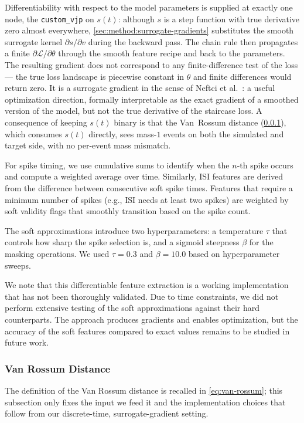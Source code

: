 Differentiability with respect to the model parameters is supplied at exactly one node, the \texttt{custom\_vjp} on $s(t)$:
although $s$ is a step function with true derivative zero almost everywhere,
\cref{sec:method:surrogate-gradients} substitutes the smooth surrogate kernel $\partial s/\partial v$ during the backward pass.
The chain rule then propagates a finite $\partial\mathcal{L}/\partial\theta$ through the smooth feature recipe and back to the parameters.
The resulting gradient does not correspond to any finite-difference test of the loss ---
the true loss landscape is piecewise constant in $\theta$ and finite differences would return zero.
It is a surrogate gradient in the sense of Neftci et al.~\cite{Neftci2019}: a useful optimization direction,
formally interpretable as the exact gradient of a smoothed version of the model, but not the true derivative of the staircase loss.
A consequence of keeping $s(t)$ binary is that the Van~Rossum distance (\cref{sec:method:opt:loss:van-rossum}),
which consumes $s(t)$ directly, sees mass-$1$ events on both the simulated and target side, with no per-event mass mismatch.

For spike timing, we use cumulative sums to identify when the $n$-th spike occurs and compute a weighted average over time.
Similarly, ISI features are derived from the difference between consecutive soft spike times.
Features that require a minimum number of spikes (e.g., ISI needs at least two spikes) are weighted by soft validity flags that smoothly transition based on the spike count.

The soft approximations introduce two hyperparameters: a temperature $\tau$ that controls how sharp the spike selection is, and a sigmoid steepness $\beta$ for the masking operations.
We used $\tau = 0.3$ and $\beta = 10.0$ based on hyperparameter sweeps.

We note that this differentiable feature extraction is a working implementation that has not been thoroughly validated.
Due to time constraints, we did not perform extensive testing of the soft approximations against their hard counterparts.
The approach produces gradients and enables optimization, but the accuracy of the soft features compared to exact values remains to be studied in future work.

\subsubsection{Van Rossum Distance}\label{sec:method:opt:loss:van-rossum}
The definition of the Van Rossum distance is recalled in \cref{eq:van-rossum};
this subsection only fixes the input we feed it and the implementation choices that follow from our discrete-time, surrogate-gradient setting.

